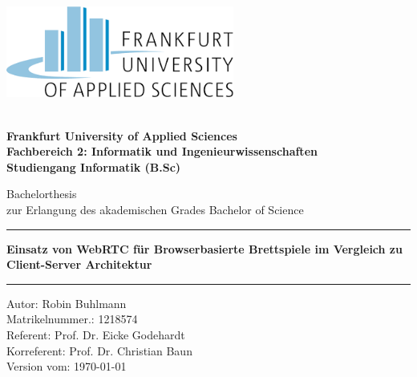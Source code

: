 \thispagestyle{empty}
\begin{center}


\includegraphics[height=3cm]{bilder/frauaslogo.png}
\begin{figure}[h!]
\centering
\end{figure}\\[1,25cm]

\Large{\textsf{\textbf{Frankfurt University of Applied Sciences}}}\\
\large{\textsf{\textbf{Fachbereich 2: Informatik und Ingenieurwissenschaften}}}\\
\large{\textsf{\textbf{Studiengang Informatik (B.Sc)}}}\\

\vspace{1,5cm}

\huge{\textsf{Bachelorthesis}}\\
\vspace{0,15cm}
\large{\textsf{zur Erlangung des akademischen Grades Bachelor of Science}}\\
\vspace{2cm}

\noindent\rule{\textwidth}{0.4pt}
\begin{Large}
\textsf{\textbf{Einsatz von WebRTC für Browserbasierte Brettspiele im Vergleich zu Client-Server Architektur}}\\
\end{Large}
\noindent\rule{\textwidth}{0.4pt}
\vspace{2,3cm}
\end{center}

\begin{large}
\textsf{Autor: Robin Buhlmann}\\[0,1cm]
\textsf{Matrikelnummer.: 1218574}\\[0,1cm]
\textsf{Referent: Prof. Dr. Eicke Godehardt}\\[0,1cm]
\textsf{Korreferent: Prof. Dr. Christian Baun}\\[0,7cm]
\textsf{Version vom: \today}
\end{large}
